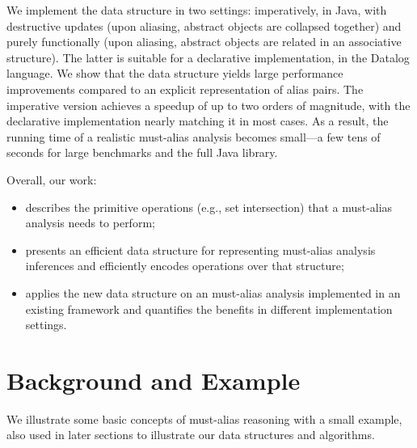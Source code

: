 We implement the data structure in two settings: imperatively, in Java, with
destructive updates (upon aliasing, abstract objects are collapsed together)
and purely functionally (upon aliasing, abstract objects are related in an
associative structure). The latter is suitable for a declarative
implementation, in the Datalog language.  We show that the data structure
yields large performance improvements compared to an explicit representation of
alias pairs. The imperative version achieves a speedup of up to two orders of
magnitude, with the declarative implementation nearly matching it in most
cases.  As a result, the running time of a realistic must-alias analysis
becomes small---a few tens of seconds for large benchmarks and the full Java
library.

Overall, our work:

\begin{itemize}
\item describes the primitive operations (e.g., set intersection) that a
	must-alias analysis needs to perform;
\item presents an efficient data structure for representing must-alias analysis
	inferences and efficiently encodes operations over that structure;
\item applies the new data structure on an must-alias analysis implemented in
	an existing framework and quantifies the benefits in different
	implementation settings.
\end{itemize}



\section{Background and Example}
\label{sec:example}

We illustrate some basic concepts of must-alias reasoning with a small example,
also used in later sections to illustrate our data structures and algorithms.

